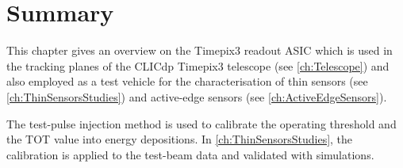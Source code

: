 

\section{Summary}
\label{sec:Summary_calibration}

This chapter gives an overview on the Timepix3 readout ASIC which is
used in the tracking planes of the CLICdp Timepix3 telescope (see
\cref{ch:Telescope}) and also employed as a test vehicle for the
characterisation of thin sensors (see \cref{ch:ThinSensorsStudies})
and active-edge sensors (see \cref{ch:ActiveEdgeSensors}).

The test-pulse injection method is used to calibrate the operating
threshold and the TOT value into energy depositions. In
\cref{ch:ThinSensorsStudies}, the calibration is applied to the
test-beam data and validated with simulations.





